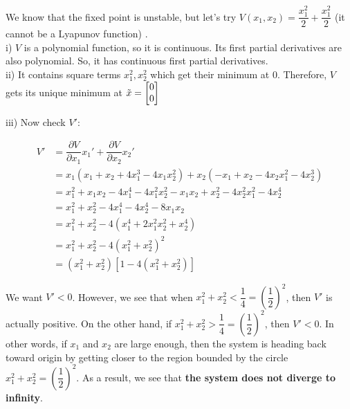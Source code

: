 \documentclass[12pt,a4paper, margin=1in]{article}
\begin{document}
\begin{enumerate}
        We know that the fixed point is unstable, but let's try $V(x_1, x_2) = \dfrac{x_1^2}{2} + \dfrac{x_1^2}{2}$ (it cannot be a Lyapunov function) .
        \\
        
        i) $V$ is a polynomial function, so it is continuous. Its first partial derivatives are also polynomial. So, it has continuous first partial derivatives.  \\

        ii) It contains square terms $x_1^2, x_2^2$ which get their minimum at 0. Therefore, $V$ gets its unique minimum at $\Tilde{x} = \begin{bmatrix}
            0 \\ 0
        \end{bmatrix}$

        \newpage

        iii) Now check $V'$:
        
            \begin{center}
            \begin{equation*}
            \begin{split}
                V' & = \dfrac{\partial V}{\partial x_1} x_1' +  \dfrac{\partial V}{\partial x_2} x_2' \\
                & = x_1(x_1 + x_2 +4x_1^3 - 4x_1x_2^2) + x_2(-x_1 + x_2 - 4x_2x_1^2 - 4x_2^3) \\
                & = x_1^2 + x_1x_2 -4x_1^4 -4x_1^2x_2^2 - x_1x_2 + x_2^2 -4x_2^2x_1^2 -4x_2^4 \\ 
                & = x_1^2 + x_2^2 -4x_1^4 -4x_2^4 -8x_1x_2 \\
                & = x_1^2 + x_2^2 -4(x_1^4 + 2x_1^2x_2^2 + x_2^4) \\
                & = x_1^2 + x_2^2 -4(x_1^2 + x_2^2)^2 \\
                & = (x_1^2 + x_2^2)[1 - 4 (x_1^2 + x_2^2)]
            \end{split}
            \end{equation*}    
            \end{center}

            We want $V' < 0$. However, we see that when $x_1^2 + x_2^2 < \dfrac{1}{4} = (\dfrac{1}{2})^2$, then $V'$ is actually positive. On the other hand, if  $x_1^2 + x_2^2 > \dfrac{1}{4} = (\dfrac{1}{2})^2$, then $V' < 0$. In other words, if $ x_1$ and $x_2$ are large enough, then the system is heading back toward origin by getting closer to the region bounded by the circle $x_1^2 + x_2^2  = (\dfrac{1}{2})^2$. 
            As a result, we see that \textbf{the system does not diverge to infinity}. \\ \\


\end{enumerate}
\end{document}
